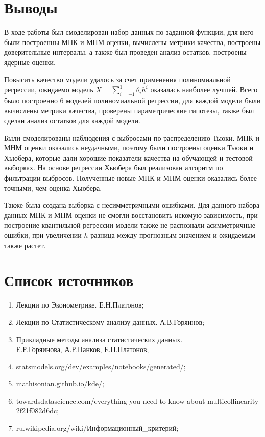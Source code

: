 \documentclass[a4paper,12pt]{article}
\begin{document}
\section{Выводы}

В ходе работы был смоделирован набор данных по заданной функции, для него были построенны МНК и МНМ оценки, вычислены метрики качества, построены доверительные интервалы, а также был проведен анализ остатков, построены ядерные оценки.

Повысить качество модели удалось за счет применения полиномиальной регрессии, ожидаемо модель $X=\sum\limits_{i=-1}^1 \theta_i h^i$ оказалась наиболее лучшей. Всего было построенно 6 моделей полиномиальной регрессии, для каждой модели были вычислены метрики качества, проверены параметрические гипотезы, также был сделан анализ остатков для каждой модели.

Были смоделированы наблюдения с выбросами по распределению Тьюки. МНК и МНМ оценки оказались неудачными, поэтому были построены оценки Тьюки и Хьюбера, которые дали хорошие показатели качества на обучающей и тестовой выборках. На основе регрессии Хьюбера был реализован алгоритм по фильтрации выбросов. Полученные новые МНК и МНМ оценки оказались более точными, чем оценка Хьюбера.

Также была создана выборка с несимметричными ошибками. Для данного набора данных МНК и МНМ оценки не смогли восстановить искомую зависимость, при построение квантильной регрессии модели также не распознали асимметричные ошибки, при увеличении $h$ разница между прогнозным значением и ожидаемым также растет.



\section{Список источников}

\begin{enumerate}
    \item Лекции по Эконометрике. Е.Н.Платонов;
    \item Лекции по Статистическому анализу данных. А.В.Горяинов;
    \item Прикладные методы анализа статистических данных.\\
    Е.Р.Горяинова, А.Р.Панков, Е.Н.Платонов;
    \item statsmodels.org/dev/examples/notebooks/generated/;
    \item mathisonian.github.io/kde/;
    \item towardsdatascience.com/everything-you-need-to-know-about-multicollinearity-2f21f082d6dc;
    \item ru.wikipedia.org/wiki/Информационный\_критерий;
\end{enumerate}
\end{document}
